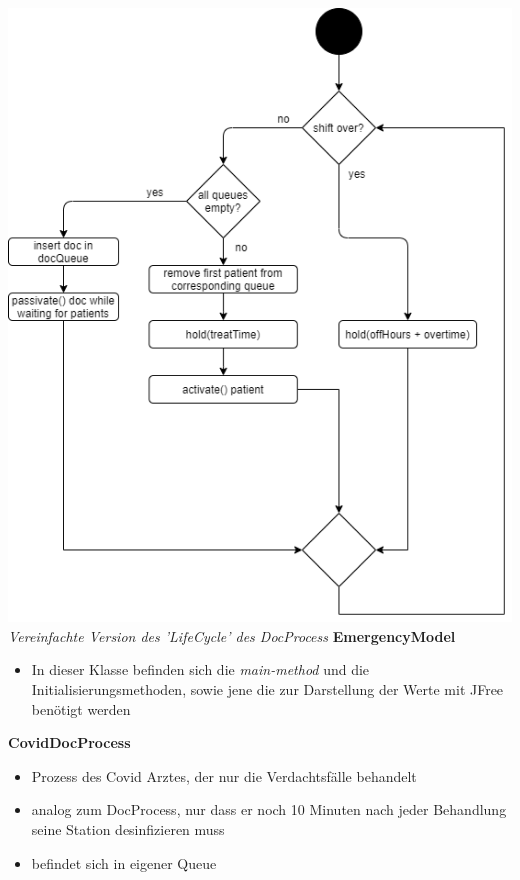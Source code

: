 \documentclass{article}
\begin{document}
\includegraphics[width=\textwidth]{img/docProcess.png}
\textit{Vereinfachte Version des 'LifeCycle' des DocProcess}
\textbf{EmergencyModel}
\begin{itemize}
    \item In dieser Klasse befinden sich die \textit{main-method} und die Initialisierungsmethoden, sowie jene die zur Darstellung der Werte mit JFree benötigt werden
\end{itemize}
\textbf{CovidDocProcess}
\begin{itemize}
    \item Prozess des Covid Arztes, der nur die Verdachtsfälle behandelt
    \item analog zum DocProcess, nur dass er noch 10 Minuten nach jeder Behandlung seine Station desinfizieren muss
    \item befindet sich in eigener Queue
\end{itemize}
\end{document}
